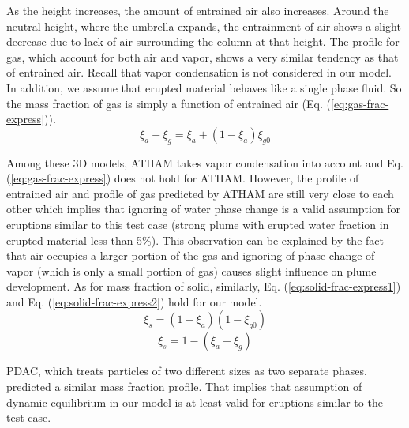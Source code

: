\documentclass[gmd, manuscript]{copernicus}
\begin{document}
As the height increases, the amount of entrained air also increases. Around the neutral height, where the umbrella expands, the entrainment of air shows a slight decrease due to lack of air surrounding the column at that height. The profile for gas, which account for both air and vapor, shows a very similar tendency as that of entrained air. Recall that vapor condensation is not considered in our model. In addition, we assume that erupted material behaves like a single phase fluid. So the mass fraction of gas is simply a function of entrained air (Eq. (\ref{eq:gas-frac-express})).
\begin{equation}
\xi_a + \xi_g = \xi_a + \left(1-\xi_a\right) \xi_{g0}
\label{eq:gas-frac-express}
\end{equation}
 
Among these 3D models, ATHAM takes vapor condensation into account and Eq. (\ref{eq:gas-frac-express}) does not hold for ATHAM. However, the profile of entrained air and profile of gas predicted by ATHAM are still very close to each other which implies that ignoring of water phase change is a valid assumption for eruptions similar to this test case (strong plume with erupted water fraction in erupted material less than 5\%). This observation can be explained by the fact that air occupies a larger portion of the gas and ignoring of phase change of vapor (which is only a small portion of gas) causes slight influence on plume development. As for mass fraction of solid, similarly, Eq. (\ref{eq:solid-frac-express1}) and Eq. (\ref{eq:solid-frac-express2}) hold for our model. 
\begin{equation}
\xi_s = \left(1 - \xi_a\right) \left(1- \xi_{g0}\right)
\label{eq:solid-frac-express1}
\end{equation}
\begin{equation}
\xi_s = 1 - \left(\xi_a + \xi_g\right)
\label{eq:solid-frac-express2}
\end{equation}

PDAC, which treats particles of two different sizes as two separate phases, predicted a similar mass fraction profile. That implies that assumption of dynamic equilibrium in our model is at least valid for eruptions similar to the test case.
\end{document}
